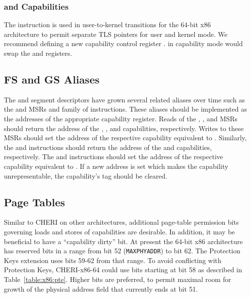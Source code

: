 \subsubsection{ and Capabilities}

The  instruction is used in user-to-kernel
transitions for the 64-bit x86 architecture to permit separate TLS
pointers for user and kernel mode.  We recommend defining a new
capability control register \KGS{}.   in capability
mode would swap the \CGS{} and \KGS{} registers.

\subsection{FS and GS Aliases}

The \FS{} and \GS{} segment descriptors have grown several related
aliases over time such as the \FSBASE{} and \GSBASE{} MSRs and
 family of instructions.  These aliases should be
implemented as the addresses of the appropriate capability register.
Reads of the \FSBASE{}, \GSBASE{}, and \KGSBASE{} MSRs should return
the address of the \CFS{}, \CGS{}, and \KGS{} capabilities,
respectively.  Writes to these MSRs should set the address of the
respective capability equivalent to .  Similarly,
the  and  instructions should
return the address of the \CFS{} and \CGS{} capabilities,
respectively.  The  and 
instructions should set the address of the respective capability
equivalent to .  If a new address is set which makes
the capability unrepresentable, the capability's tag should be
cleared.

\subsection{Page Tables}

Similar to CHERI on other architectures, additional page-table
permission bits governing loads and stores of capabilities are
desirable.  In addition, it may be beneficial to have a ``capability
dirty'' bit.  At present the 64-bit x86 architecture has reserved bits
in a range from bit 52 (\texttt{MAXPHYADDR}) to bit 62.  The Protection Keys
extension uses bits 59-62 from that range.  To avoid conflicting with
Protection Keys, CHERI-x86-64 could use bits starting at bit 58 as described in Table~\ref{table:x86:pte}.  Higher bits are
preferred, to permit maximal room for growth of the physical address
field that currently ends at bit 51.

